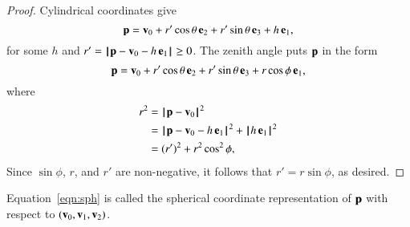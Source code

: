 %
%
%

%
%
%
%
%
%

\begin{proof}
Cylindrical coordinates give
\begin{displaymath}
{\mathbf p} = {\mathbf v}_0 + r'\cos\theta\,{\mathbf e}_2 + r'\sin\theta\,{\mathbf e}_3 + h\, {\mathbf e}_1,
\end{displaymath}
for some $h$ and $r'={{\hskip0.1em|\hskip-0.15em|\hskip0.1em}{\mathbf p}-{\mathbf v}_0-h\,{\mathbf e}_1{\hskip0.1em|\hskip-0.15em|\hskip0.1em}}\ge0$.  The zenith angle
puts ${\mathbf p}$ in the form
\begin{displaymath}
{\mathbf p} = {\mathbf v}_0 + r'\cos\theta\,{\mathbf e}_2 + r'\sin\theta\,{\mathbf e}_3 + r\cos\phi\, {\mathbf e}_1,
\end{displaymath}
where
\begin{align*}
r^2 &= \norm{\p}{\v_0}^2\\ 
&= \normo{\p-\v_0-h\,\e_1}^2 + \normo{h\,\e_1}^2\\
&= (r')^2 + r^2 \cos^2\phi,
\end{align*}
Since $\sin\phi$, $r$, and $r'$ are non-negative, it follows that $r'=r\sin\phi$, as
desired.
\end{proof}

\begin{definition}\label{def:sph}
  Equation~\eqref{eqn:sph} is called the spherical coordinate representation of ${\mathbf p}$ with
  respect to $({\mathbf v}_0,{\mathbf v}_1,{\mathbf v}_2)$.
\end{definition}



%


